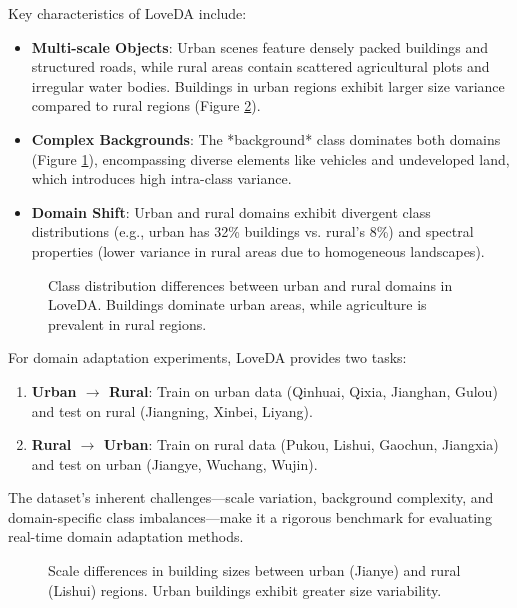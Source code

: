\documentclass{article}
\begin{document}
\begin{multicols}{2}
		Key characteristics of LoveDA include:  
		\begin{itemize}  
			\item \textbf{Multi-scale Objects}: Urban scenes feature densely packed buildings and structured roads, while rural areas contain scattered agricultural plots and irregular water bodies. Buildings in urban regions exhibit larger size variance compared to rural regions (Figure \ref{fig:scale}).  
			\item \textbf{Complex Backgrounds}: The *background* class dominates both domains (Figure \ref{fig:class_dist}), encompassing diverse elements like vehicles and undeveloped land, which introduces high intra-class variance.  
			\item \textbf{Domain Shift}: Urban and rural domains exhibit divergent class distributions (e.g., urban has 32\% buildings vs. rural’s 8\%) and spectral properties (lower variance in rural areas due to homogeneous landscapes).  
		\end{itemize}  
		
		\begin{figure}[ht]  
			\centering  

			\caption{Class distribution differences between urban and rural domains in LoveDA. Buildings dominate urban areas, while agriculture is prevalent in rural regions.}  
			\label{fig:class_dist}  
		\end{figure}  
		
		For domain adaptation experiments, LoveDA provides two tasks:  
		\begin{enumerate}  
			\item \textbf{Urban $\rightarrow$ Rural}: Train on urban data (Qinhuai, Qixia, Jianghan, Gulou) and test on rural (Jiangning, Xinbei, Liyang).  
			\item \textbf{Rural $\rightarrow$ Urban}: Train on rural data (Pukou, Lishui, Gaochun, Jiangxia) and test on urban (Jiangye, Wuchang, Wujin).  
		\end{enumerate}  
		
		The dataset’s inherent challenges—scale variation, background complexity, and domain-specific class imbalances—make it a rigorous benchmark for evaluating real-time domain adaptation methods.  
		
		\begin{figure}[ht]  
			\centering  

			\caption{Scale differences in building sizes between urban (Jianye) and rural (Lishui) regions. Urban buildings exhibit greater size variability.}  
			\label{fig:scale}  
		\end{figure}

\end{multicols}
\end{document}
